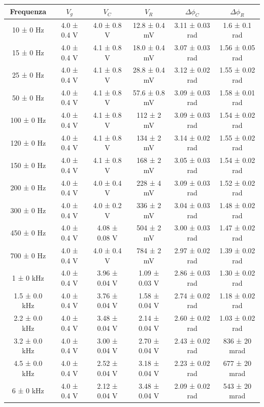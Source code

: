 \documentclass[a4paper]{article}
\begin{document}
\begin{table}[htbp]
    \centering
    \begin{tabular}{|c|c|c|c|c|c|}
    \hline
    Frequenza & $V_g$ & $V_C$ & $V_R$ & $\Delta\phi_C$ & $\Delta\phi_R$ \\\hline\hline
    10 ± 0 Hz & 4.0 ± 0.4 V & 4.0 ± 0.8 V & 12.8 ± 0.4 mV & 3.11 ± 0.03 rad & 1.6 ± 0.1 rad \\
    15 ± 0 Hz & 4.0 ± 0.4 V & 4.1 ± 0.8 V & 18.0 ± 0.4 mV & 3.07 ± 0.03 rad & 1.56 ± 0.05 rad \\
    25 ± 0 Hz & 4.0 ± 0.4 V & 4.1 ± 0.8 V & 28.8 ± 0.4 mV & 3.12 ± 0.02 rad & 1.55 ± 0.02 rad \\
    50 ± 0 Hz & 4.0 ± 0.4 V & 4.1 ± 0.8 V & 57.6 ± 0.8 mV & 3.09 ± 0.03 rad & 1.58 ± 0.01 rad \\
    100 ± 0 Hz & 4.0 ± 0.4 V & 4.1 ± 0.8 V & 112 ± 2 mV & 3.09 ± 0.03 rad & 1.54 ± 0.02 rad \\
    120 ± 0 Hz & 4.0 ± 0.4 V & 4.1 ± 0.8 V & 134 ± 2 mV & 3.14 ± 0.02 rad & 1.55 ± 0.02 rad \\
    150 ± 0 Hz & 4.0 ± 0.4 V & 4.1 ± 0.8 V & 168 ± 2 mV & 3.05 ± 0.03 rad & 1.54 ± 0.02 rad \\
    200 ± 0 Hz & 4.0 ± 0.4 V & 4.0 ± 0.4 V & 228 ± 4 mV & 3.09 ± 0.03 rad & 1.52 ± 0.02 rad \\
    300 ± 0 Hz & 4.0 ± 0.4 V & 4.0 ± 0.2 V & 336 ± 2 mV & 3.04 ± 0.03 rad & 1.48 ± 0.02 rad \\
    450 ± 0 Hz & 4.0 ± 0.4 V & 4.08 ± 0.08 V & 504 ± 2 mV & 3.00 ± 0.03 rad & 1.47 ± 0.02 rad \\
    700 ± 0 Hz & 4.0 ± 0.4 V & 4.0 ± 0.4 V & 784 ± 2 mV & 2.97 ± 0.02 rad & 1.39 ± 0.02 rad \\
    1 ± 0 kHz & 4.0 ± 0.4 V & 3.96 ± 0.04 V & 1.09 ± 0.03 V & 2.86 ± 0.03 rad & 1.30 ± 0.02 rad \\
    1.5 ± 0.0 kHz & 4.0 ± 0.4 V & 3.76 ± 0.04 V & 1.58 ± 0.04 V & 2.74 ± 0.02 rad & 1.18 ± 0.02 rad \\
    2.2 ± 0.0 kHz & 4.0 ± 0.4 V & 3.48 ± 0.04 V & 2.14 ± 0.04 V & 2.60 ± 0.02 rad & 1.03 ± 0.02 rad \\
    3.2 ± 0.0 kHz & 4.0 ± 0.4 V & 3.00 ± 0.04 V & 2.70 ± 0.04 V & 2.43 ± 0.02 rad & 836 ± 20 mrad \\
    4.5 ± 0.0 kHz & 4.0 ± 0.4 V & 2.52 ± 0.04 V & 3.18 ± 0.04 V & 2.23 ± 0.02 rad & 677 ± 20 mrad \\
    6 ± 0 kHz & 4.0 ± 0.4 V & 2.12 ± 0.04 V & 3.48 ± 0.04 V & 2.09 ± 0.02 rad & 543 ± 20 mrad \\

\end{tabular}
\end{table}
\end{document}
